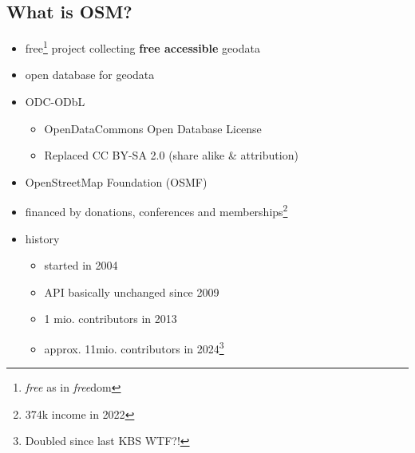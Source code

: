 \documentclass{beamer}
\begin{document}
		\subsection{What is OSM?}
	
			\begin{frame}
				\begin{itemize}
					\item free\footnote{\textit{free} as in \textit{free}dom} project collecting \textbf{free accessible} geodata
					\item open database for geodata
					\item ODC-ODbL
					\begin{itemize}
						\item OpenDataCommons Open Database License
						\item Replaced CC BY-SA 2.0 {\tiny (share alike \& attribution)}
					\end{itemize}\pause
					\item OpenStreetMap Foundation (OSMF)
					\item financed by donations, conferences and memberships\footnote{374k income in 2022}
					\item history
					\begin{itemize}
						\item started in 2004
						\item API basically unchanged since 2009
						\item 1 mio. contributors in 2013
						\item approx. 11mio. contributors in 2024\footnote{Doubled since last KBS WTF?!}
					\end{itemize}
				\end{itemize}
			\end{frame}
\end{document}
